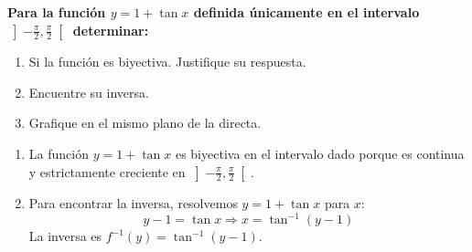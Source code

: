 \documentclass[12pt,answers]{exam}
\begin{document}
\begin{questions}
\begin{solution}
\begin{center}
\end{center}
\vspace{0.5cm}
\end{solution}

\vspace{0.5cm}

\question \large\textbf{Para la función $y = 1 + \tan x$ definida únicamente en el intervalo $\displaystyle \left]-\frac{\pi}{2}, \frac{\pi}{2}\right[$ determinar:}
\begin{enumerate}[label=\alph*.]
    \item Si la función es biyectiva. Justifique su respuesta.
    \item Encuentre su inversa.
    \item Grafique en el mismo plano de la directa.
\end{enumerate}
\begin{solution}
\begin{enumerate}[label=\alph*.]
    \item La función $y = 1 + \tan x$ es biyectiva en el intervalo dado porque es continua y estrictamente creciente en $\left]-\frac{\pi}{2}, \frac{\pi}{2}\right[$.
    
    \item Para encontrar la inversa, resolvemos $y = 1 + \tan x$ para $x$:
    \[
    y - 1 = \tan x \Rightarrow x = \tan^{-1}(y - 1)
    \]
    La inversa es $f^{-1}(y) = \tan^{-1}(y - 1)$.
    

\end{enumerate}
\end{solution}
\end{questions}
\end{document}

